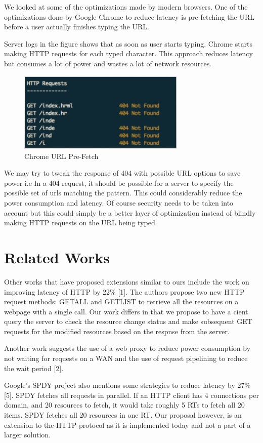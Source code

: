 \documentclass{sigplanconf}
\begin{document}
We looked at some of the optimizations made by modern browsers. One of the optimizations done by Google Chrome to reduce latency is pre-fetching the URL before a user actually finishes typing the URL.
 
Server logs in the figure shows that  as  soon as user starts typing, Chrome starts making HTTP requests for each typed character. This approach reduces latency but consumes a lot of power and wastes a lot of network resources. 

\begin{figure}[ht!]
\centering
\includegraphics[width=80mm]{chrome}
\caption{Chrome URL Pre-Fetch}
\label{fig:sp_gd_mnist}
\end{figure}

We may try to tweak the response of 404 with possible URL options to save power i.e In a 404 request, it should be possible for a server to specify the possible set of urls matching the pattern. This could considerably reduce the power consumption and latency. Of course security needs to be taken into account but this could simply be a better layer of optimization instead of blindly making HTTP requests on the URL being typed. 


\section{ Related Works}

Other works that have proposed extensions similar to ours include the work on improving latency of HTTP by 22\% [1]. The authors propose two new HTTP request methods: GETALL and GETLIST to retrieve all the resources on a webpage with a single call. Our work differs in that we propose to have a cient query the server to check the resource change status and make subsequent GET requests for the modified resources based on the respnse from the server.

Another work suggests the use of a web proxy to reduce power consumption by not waiting for requests on a WAN and the use of request pipelining to reduce the wait period [2].

Google's SPDY project also mentions some strategies to reduce latency by 27\%[5]. SPDY fetches all requests in parallel. If an HTTP client has 4 connections per domain, and 20 resources to fetch, it would take roughly 5 RTs to fetch all 20 items. SPDY fetches all 20 resources in one RT. Our proposal however, is an extension to the HTTP protocol as it is implemented today and not a part of a larger solution.
\end{document}
